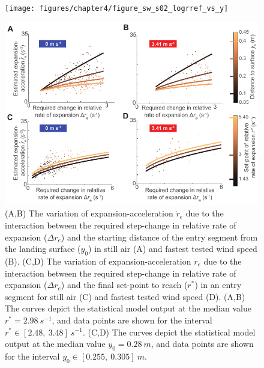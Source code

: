 \newpage
\begin{figure}[H]
	\centering
	\texttt{[image: figures/chapter4/figure\_sw\_s02\_logrref\_vs\_y]}
	\caption{}
	\label{figure_sw_s02_logrref_vs_y}
\end{figure}

\newpage
\begin{figure}[H]
	\centering
	\includegraphics[scale=0.95]{figures/chapter4/figure_sw_s03_rdot}
	\caption{ (A,B) The variation of expansion-acceleration $\dot{r}_e$ due to the interaction between the required step-change in relative rate of expansion ($\Delta r_e$) and the starting distance of the entry segment from the landing surface ($y_0$) in still air (A) and fastest tested wind speed (B). (C,D) The variation of expansion-acceleration $\dot{r}_e$ due to the interaction between the required step-change in relative rate of expansion ($\Delta r_e$) and the final set-point to reach ($r^*$) in an entry segment for still air (C) and fastest tested wind speed (D). (A,B) The curves depict the statistical model output at the median value $r^*=2.98~ s^{-1}$, and data points are shown for the interval $r^* \in [2.48,~3.48]~s^{-1}$. (C,D) The curves depict the statistical model output at the median value $y_0=0.28~m$, and data points are shown for the interval $y_0 \in [0.255,~0.305]~m$.  }
	\label{figure_sw_s03_rdot}
\end{figure}

